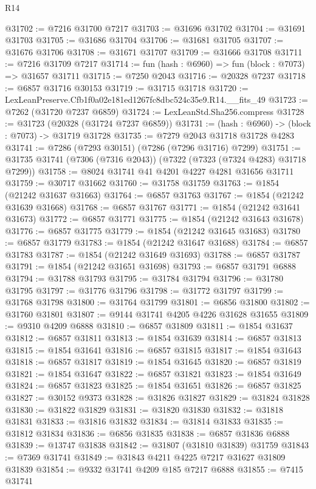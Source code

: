 \begin{lexlean}{R14}
\begin{coremodule}
@31702 := @7216 @31700 @7217
@31703 := @31696 @31702
@31704 := @31691 @31703
@31705 := @31686 @31704
@31706 := @31681 @31705
@31707 := @31676 @31706
@31708 := @31671 @31707
@31709 := @31666 @31708
@31711 := @7216 @31709 @7217
@31714 := fun (hash : @6960) => fun (block : @7073) => @31657 @31711
@31715 := @7250 @2043
@31716 := @20328 @7237
@31718 := @6857 @31716 @30153
@31719 := @31715 @31718
@31720 := LexLeanPreserve.Cfb1f0a02e181ed1267fc8dbc524c35e9.R14.__fits_49
@31723 := @7262 (@31720 @7237 @6859)
@31724 := LexLeanStd.Sha256.compress
@31728 := @31723 (@20328 (@31724 @7237 @6859))
@31731 := (hash : @6960) -> (block : @7073) -> @31719 @31728
@31735 := @7279 @2043 @31718 @31728 @4283
@31741 := @7286 (@7293 @30151) (@7286 (@7296 @31716) @7299)
@31751 := @31735 @31741 (@7306 (@7316 @2043)) (@7322 (@7323 (@7324 @4283) @31718 @7299))
@31758 := @8024 @31741 @41 @4201 @4227 @4281 @31656 @31711
@31759 := @30717 @31662
@31760 := @31758 @31759
@31763 := @1854 (@21242 @31637 @31663)
@31764 := @6857 @31763
@31767 := @1854 (@21242 @31639 @31668)
@31768 := @6857 @31767
@31771 := @1854 (@21242 @31641 @31673)
@31772 := @6857 @31771
@31775 := @1854 (@21242 @31643 @31678)
@31776 := @6857 @31775
@31779 := @1854 (@21242 @31645 @31683)
@31780 := @6857 @31779
@31783 := @1854 (@21242 @31647 @31688)
@31784 := @6857 @31783
@31787 := @1854 (@21242 @31649 @31693)
@31788 := @6857 @31787
@31791 := @1854 (@21242 @31651 @31698)
@31793 := @6857 @31791 @6888
@31794 := @31788 @31793
@31795 := @31784 @31794
@31796 := @31780 @31795
@31797 := @31776 @31796
@31798 := @31772 @31797
@31799 := @31768 @31798
@31800 := @31764 @31799
@31801 := @6856 @31800
@31802 := @31760 @31801
@31807 := @9144 @31741 @4205 @4226 @31628 @31655
@31809 := @9310 @4209 @6888
@31810 := @6857 @31809
@31811 := @1854 @31637
@31812 := @6857 @31811
@31813 := @1854 @31639
@31814 := @6857 @31813
@31815 := @1854 @31641
@31816 := @6857 @31815
@31817 := @1854 @31643
@31818 := @6857 @31817
@31819 := @1854 @31645
@31820 := @6857 @31819
@31821 := @1854 @31647
@31822 := @6857 @31821
@31823 := @1854 @31649
@31824 := @6857 @31823
@31825 := @1854 @31651
@31826 := @6857 @31825
@31827 := @30152 @9373
@31828 := @31826 @31827
@31829 := @31824 @31828
@31830 := @31822 @31829
@31831 := @31820 @31830
@31832 := @31818 @31831
@31833 := @31816 @31832
@31834 := @31814 @31833
@31835 := @31812 @31834
@31836 := @6856 @31835
@31838 := @6857 @31836 @6888
@31839 := @13747 @31838
@31842 := @31807 (@31810 @31839) @31759
@31843 := @7369 @31741
@31849 := @31843 @4211 @4225 @7217 @31627 @31809 @31839
@31854 := @9332 @31741 @4209 @185 @7217 @6888
@31855 := @7415 @31741

\end{coremodule}
\end{lexlean}
